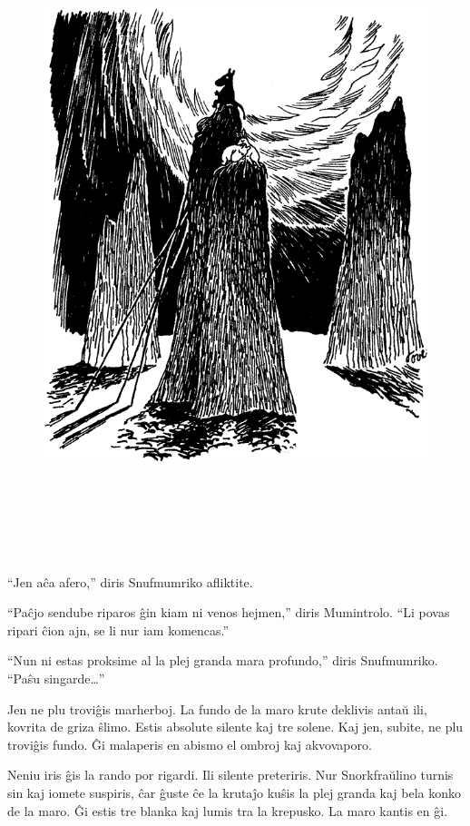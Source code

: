 \begin{figure}[htbp]
\centering
\includegraphics[width=450pt,height=531pt]{7-8.png}
\caption{}
\label{7-8}
\end{figure}

``Jen aĉa afero,'' diris Snufmumriko afliktite.

``Paĉjo sendube riparos ĝin kiam ni venos hejmen,'' diris Mumintrolo. ``Li povas ripari ĉion ajn, se li nur iam komencas.''

``Nun ni estas proksime al la plej granda mara profundo,'' diris Snufmumriko. ``Paŝu singarde{\ldots}''

Jen ne plu troviĝis marherboj. La fundo de la maro krute deklivis antaŭ ili, kovrita de griza ŝlimo. Estis absolute silente kaj tre solene. Kaj jen, subite, ne plu troviĝis fundo. Ĝi malaperis en abismo el ombroj kaj akvovaporo.

Neniu iris ĝis la rando por rigardi. Ili silente preteriris. Nur Snorkfraŭlino turnis sin kaj iomete suspiris, ĉar ĝuste ĉe la krutaĵo kuŝis la plej granda kaj bela konko de la maro. Ĝi estis tre blanka kaj lumis tra la krepusko. La maro kantis en ĝi.

